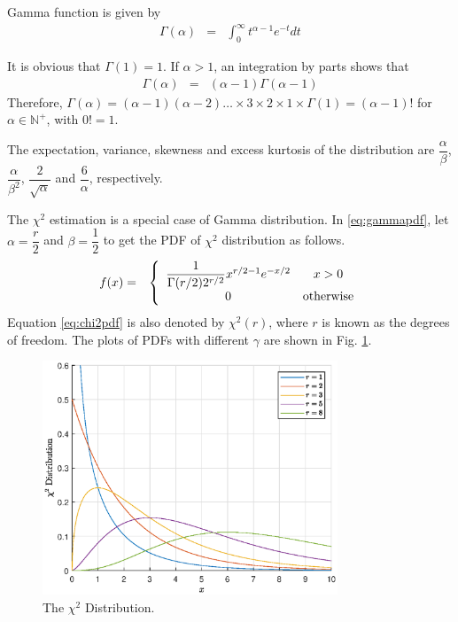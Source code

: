 \begin{shortbox}

Gamma function is given by
\begin{eqnarray}
  \Gamma(\alpha) &=& \int_{0}^{\infty}t^{\alpha-1}e^{-t}dt \nonumber
\end{eqnarray}

It is obvious that $\Gamma(1)=1$. If $\alpha > 1$, an integration by parts shows that
\begin{eqnarray}
  \Gamma(\alpha) &=& (\alpha-1)\Gamma(\alpha-1) \nonumber
\end{eqnarray}
Therefore, $\Gamma(\alpha)=(\alpha-1)(\alpha-2)\ldots \times 3 \times 2 \times 1 \times \Gamma(1) = (\alpha-1)!$ for $\alpha \in \mathbb{N}^+$, with $0!=1$.

\end{shortbox}

The expectation, variance, skewness and excess kurtosis of the distribution are $\dfrac{\alpha}{\beta}$, $\dfrac{\alpha}{\beta^2}$, $\dfrac{2}{\sqrt{\alpha}}$ and $\dfrac{6}{\alpha}$, respectively.

The $\chi^2$ estimation is a special case of Gamma distribution. In \eqref{eq:gammapdf}, let $\alpha = \dfrac{r}{2}$ and $\beta=\dfrac{1}{2}$ to get the PDF of $\chi^2$ distribution as follows.
\begin{eqnarray}
  f(x) &=& \left\{\begin{array}{cc}
                    \dfrac{1}{\Gamma(r/2)2^{r/2}}x^{r/2-1}e^{-x/2} & x > 0  \\
                    0 & \textup{otherwise}
                  \end{array}\right. \label{eq:chi2pdf}
\end{eqnarray}
Equation \eqref{eq:chi2pdf} is also denoted by $\chi^2(r)$, where $r$ is known as the degrees of freedom. The plots of PDFs with different $\gamma$ are shown in Fig. \ref{fig:chi2_pdf}.
\begin{figure}
	\centering
	\includegraphics[width=250pt]{chapters/part-1/figures/chi2_pdf.eps}
	\caption{The $\chi^2$ Distribution.} \label{fig:chi2_pdf}
\end{figure}


